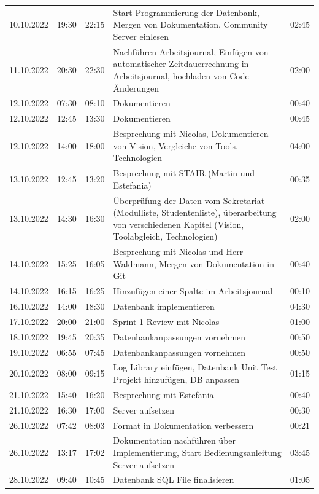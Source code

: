 \documentclass[a4paper, table]{article}
\begin{document}
\begin{longtable}[h]{|l|l|l|p{20em}|l|}
    10.10.2022 & 19:30 & 22:15 & Start Programmierung der Datenbank, Mergen von   Dokumentation, Community Server einlesen & 02:45 \\
    11.10.2022 & 20:30 & 22:30 & Nachführen Arbeitsjournal, Einfügen von   automatischer Zeitdauerrechnung in Arbeitsjournal, hochladen von Code   Änderungen & 02:00 \\
    12.10.2022 & 07:30 & 08:10 & Dokumentieren & 00:40 \\
    12.10.2022 & 12:45 & 13:30 & Dokumentieren & 00:45 \\
    12.10.2022 & 14:00 & 18:00 & Besprechung mit Nicolas, Dokumentieren von   Vision, Vergleiche von Tools, Technologien & 04:00 \\
    13.10.2022 & 12:45 & 13:20 & Besprechung mit STAIR (Martin und Estefania) & 00:35 \\
    13.10.2022 & 14:30 & 16:30 & Überprüfung der Daten vom Sekretariat   (Modulliste, Studentenliste), überarbeitung von verschiedenen Kapitel   (Vision, Toolabgleich, Technologien) & 02:00 \\
    14.10.2022 & 15:25 & 16:05 & Besprechung mit Nicolas und Herr Waldmann, Mergen   von Dokumentation in Git & 00:40 \\
    14.10.2022 & 16:15 & 16:25 & Hinzufügen einer Spalte im Arbeitsjournal & 00:10 \\
    16.10.2022 & 14:00 & 18:30 & Datenbank implementieren & 04:30 \\
    17.10.2022 & 20:00 & 21:00 & Sprint 1 Review mit   Nicolas & 01:00 \\
    18.10.2022 & 19:45 & 20:35 & Datenbankanpassungen   vornehmen & 00:50 \\
    19.10.2022 & 06:55 & 07:45 & Datenbankanpassungen   vornehmen & 00:50 \\
    20.10.2022 & 08:00 & 09:15 & Log Library einfügen, Datenbank Unit Test Projekt   hinzufügen, DB anpassen & 01:15 \\
    21.10.2022 & 15:40 & 16:20 & Besprechung mit Estefania & 00:40 \\
    21.10.2022 & 16:30 & 17:00 & Server aufsetzen & 00:30 \\
    26.10.2022 & 07:42 & 08:03 & Format in Dokumentation   verbessern & 00:21 \\
    26.10.2022 & 13:17 & 17:02 & Dokumentation nachführen über Implementierung,   Start Bedienungsanleitung Server aufsetzen & 03:45 \\
    28.10.2022 & 09:40 & 10:45 & Datenbank SQL File   finalisieren & 01:05 \\

\end{longtable}
\end{document}
